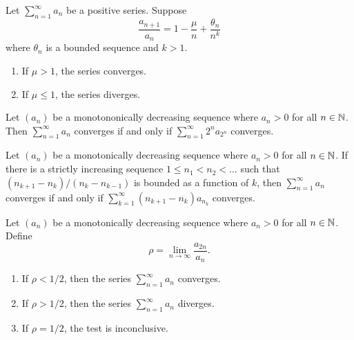 \begin{proposition}
  Let $\sum_{n = 1}^{\infty} a_n$ be a positive series. Suppose
  \[ \frac{a_{n + 1}}{a_n} = 1 - \frac{\mu}{n} + \frac{\theta_n}{n^k} \]
  where $\theta_n$ is a bounded sequence and $k > 1$.
  \begin{enumerate}
    \item If $\mu > 1$, the series converges.
    \item If $\mu \leq 1$, the series diverges.
  \end{enumerate}
\end{proposition}

\begin{proposition}
  Let $(a_n)$ be a monotononically decreasing sequence where $a_n
  > 0$ for all $n \in \mathbb N$. Then $\sum_{n = 1}^{\infty} a_n$
  converges if and only if $\sum_{n = 1}^{\infty} 2^n a_{2^n}$ converges.
\end{proposition}

\begin{proposition}
  Let $(a_n)$ be a monotonically decreasing sequence where $a_n >
  0$ for all $n \in \mathbb N$. If there is a strictly increasing sequence
  $1 \leq n_1 < n_2 < \dots$ such that $(n_{k + 1} - n_k) / (n_{k} -
  n_{k - 1})$ is bounded as a function of $k$, then $\sum_{n =
  1}^{\infty} a_n$ converges if and only if $\sum_{k = 1}^{\infty}
  (n_{k + 1} - n_k) a_{n_k}$ converges.
\end{proposition}

\begin{proposition}
  Let $(a_n)$ be a monotonically decreasing sequence where $a_n > 0$
  for all $n \in \mathbb N$. Define
  \[ \rho = \lim_{n \to \infty} \frac{a_{2n}}{a_n}. \]
  \begin{enumerate}
    \item If $\rho < 1/2$, then the series $\sum_{n = 1}^{\infty}
      a_n$ converges.
    \item If $\rho > 1/2$, then the series $\sum_{n = 1}^{\infty} a_n$ diverges.
    \item If $\rho = 1/2$, the test is inconclusive.
  \end{enumerate}
\end{proposition}

